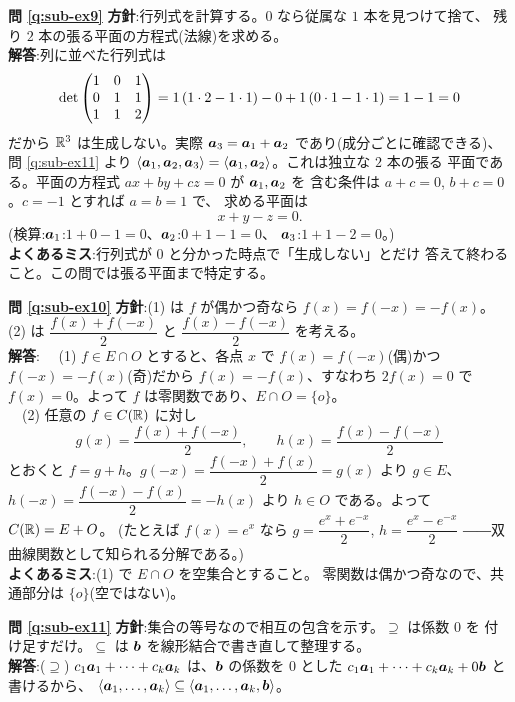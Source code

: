 \bigskip
\noindent\textbf{問 \ref{q:sub-ex9}}\quad
\textbf{方針}:行列式を計算する。$0$ なら従属な $1$ 本を見つけて捨て、
残り $2$ 本の張る平面の方程式(法線)を求める。\\
\textbf{解答}:列に並べた行列式は
\[
\det \begin{pmatrix}1 & 0 & 1 \\ 0 & 1 & 1 \\ 1 & 1 & 2\end{pmatrix}
= 1\,(1 \cdot 2 - 1 \cdot 1) - 0 + 1\,(0 \cdot 1 - 1 \cdot 1)
= 1 - 1 = 0
\]
だから $\mathbb{R}^3$ は生成しない。実際 $\bm{a}_3 = \bm{a}_1 + \bm{a}_2$
であり(成分ごとに確認できる)、問 \ref{q:sub-ex11} より
$\langle \bm{a}_1, \bm{a}_2, \bm{a}_3 \rangle
= \langle \bm{a}_1, \bm{a}_2 \rangle$。これは独立な $2$ 本の張る
平面である。平面の方程式 $ax + by + cz = 0$ が $\bm{a}_1, \bm{a}_2$ を
含む条件は $a + c = 0$, $b + c = 0$。$c = -1$ とすれば $a = b = 1$ で、
求める平面は
\[
x + y - z = 0.
\]
(検算:$\bm{a}_1$:$1 + 0 - 1 = 0$、$\bm{a}_2$:$0 + 1 - 1 = 0$、
$\bm{a}_3$:$1 + 1 - 2 = 0$。)\\
\textbf{よくあるミス}:行列式が $0$ と分かった時点で「生成しない」とだけ
答えて終わること。この問では張る平面まで特定する。

\bigskip
\noindent\textbf{問 \ref{q:sub-ex10}}\quad
\textbf{方針}:(1) は $f$ が偶かつ奇なら $f(x) = f(-x) = -f(x)$。
(2) は $\dfrac{f(x) + f(-x)}{2}$ と $\dfrac{f(x) - f(-x)}{2}$ を考える。\\
\textbf{解答}:
　(1) $f \in E \cap O$ とすると、各点 $x$ で $f(x) = f(-x)$(偶)かつ
$f(-x) = -f(x)$(奇)だから $f(x) = -f(x)$、すなわち $2f(x) = 0$ で
$f(x) = 0$。よって $f$ は零関数であり、$E \cap O = \{o\}$。\\
　(2) 任意の $f \in C(\mathbb{R})$ に対し
\[
g(x) = \frac{f(x) + f(-x)}{2}, \qquad h(x) = \frac{f(x) - f(-x)}{2}
\]
とおくと $f = g + h$。$g(-x) = \dfrac{f(-x) + f(x)}{2} = g(x)$ より
$g \in E$、$h(-x) = \dfrac{f(-x) - f(x)}{2} = -h(x)$ より $h \in O$
である。よって $C(\mathbb{R}) = E + O$。
(たとえば $f(x) = e^x$ なら $g = \dfrac{e^x + e^{-x}}{2}$,
$h = \dfrac{e^x - e^{-x}}{2}$ ――双曲線関数として知られる分解である。)\\
\textbf{よくあるミス}:(1) で $E \cap O$ を空集合とすること。
零関数は偶かつ奇なので、共通部分は $\{o\}$(空ではない)。

\bigskip
\noindent\textbf{問 \ref{q:sub-ex11}}\quad
\textbf{方針}:集合の等号なので相互の包含を示す。$\supseteq$ は係数 $0$ を
付け足すだけ。$\subseteq$ は $\bm{b}$ を線形結合で書き直して整理する。\\
\textbf{解答}:($\supseteq$)
$c_1\bm{a}_1 + \cdots + c_k\bm{a}_k$ は、$\bm{b}$ の係数を $0$ とした
$c_1\bm{a}_1 + \cdots + c_k\bm{a}_k + 0\bm{b}$ と書けるから、
$\langle \bm{a}_1, \dots, \bm{a}_k \rangle \subseteq
\langle \bm{a}_1, \dots, \bm{a}_k, \bm{b} \rangle$。

